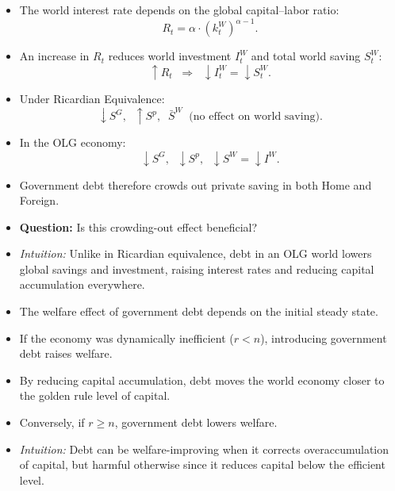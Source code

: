 \documentclass[12pt]{article}
\begin{document}
\begin{itemize}
  \item The world interest rate depends on the global capital–labor ratio:
  \[
  R_t = \alpha \cdot (k_t^W)^{\alpha-1}.
  \]

  \item An increase in $R_t$ reduces world investment $I_t^W$ and total world saving $S_t^W$:
  \[
  \uparrow R_t \;\;\Rightarrow\;\; \downarrow I_t^W = \downarrow S_t^W.
  \]

  \item Under Ricardian Equivalence:
  \[
  \downarrow S^G,\;\; \uparrow S^p,\;\; \bar{S}^W \;\;\text{(no effect on world saving)}.
  \]

  \item In the OLG economy:
  \[
  \downarrow S^G,\;\; \downarrow S^p,\;\; \downarrow S^W = \downarrow I^W.
  \]

  \item Government debt therefore crowds out private saving in both Home and Foreign.

  \item \textbf{Question:} Is this crowding-out effect beneficial?

  \item \textit{Intuition:} Unlike in Ricardian equivalence, debt in an OLG world lowers global savings and investment, raising interest rates and reducing capital accumulation everywhere.
\end{itemize}

\begin{itemize}
  \item The welfare effect of government debt depends on the initial steady state.  

  \item If the economy was dynamically inefficient ($r < n$), introducing government debt raises welfare.  

  \item By reducing capital accumulation, debt moves the world economy closer to the golden rule level of capital.  

  \item Conversely, if $r \geq n$, government debt lowers welfare.  

  \item \textit{Intuition:} Debt can be welfare-improving when it corrects overaccumulation of capital, but harmful otherwise since it reduces capital below the efficient level.  
\end{itemize}
\end{document}
